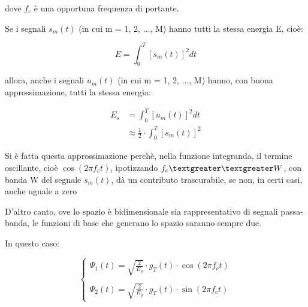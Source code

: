 dove $f_c$ è una opportuna frequenza di portante. \newline 

Se i segnali $s_m (t)$ (in cui m = 1, 2, $\dots$, M) hanno tutti la stessa energia E, cioè: 

{
    \Large 
    \begin{equation}
        E = \int_{0}^{T} \left[ s_{m} (t) \right]^{2} dt 
    \end{equation}
}

allora, anche i segnali $u_m (t)$ (in cui m = 1, 2, $\dots$, M) hanno, con buona approssimazione, tutti la stessa energia: 

{
    \Large 
    \begin{equation}
        \begin{split}
            E_s 
            &= 
            \int_{0}^{T}
            \left[ u_m (t)\right]^{2}
            dt
            \\
            &\approx
            \frac{1}{2}
            \cdot 
            \int_{0}^{T}
            \left[ s_m (t)\right]^{2}
        \end{split}
    \end{equation}
}

\begin{tcolorbox}
    Si è fatta questa approssimazione perchè, nella funzione integranda, 
    il termine oscillante, cioè $\cos(2 \pi f_c t)$, ipotizzando $f_c \textgreater \textgreater W$, 
    con banda W del segnale $s_m (t)$, dà un contributo trascurabile, se non, in certi casi, anche uguale a zero
\end{tcolorbox}

D'altro canto, ove lo spazio è bidimensionale sia rappresentativo di segnali passa-banda, 
le funzioni di base che generano lo spazio saranno sempre due. \newline 

In questo caso: 

{
    \Large 
    \begin{equation}
        \begin{cases}
            \Psi_1 (t) = \sqrt{\frac{2}{E_g}} \cdot g_T (t) \cdot \cos(2 \pi f_c t)
            \\
            \quad
            \\
            \Psi_2 (t) = \sqrt{\frac{2}{E_g}} \cdot g_T (t) \cdot \sin(2 \pi f_c t) 
        \end{cases}
    \end{equation}
}

